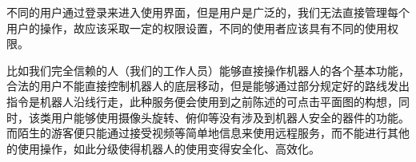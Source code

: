 


不同的用户通过登录来进入使用界面，但是用户是广泛的，我们无法直接管理每个用户的操作，故应该采取一定的权限设置，不同的使用者应该具有不同的使用权限。

比如我们完全信赖的人（我们的工作人员）能够直接操作机器人的各个基本功能，合法的用户不能直接控制机器人的底层移动，但是能够通过部分规定好的路线发出指令是机器人沿线行走，此种服务便会使用到之前陈述的可点击平面图的构想，同时，该类用户能够使用摄像头旋转、俯仰等没有涉及到机器人安全的器件的功能。而陌生的游客便只能通过接受视频等简单地信息来使用远程服务，而不能进行其他的使用操作，如此分级使得机器人的使用变得安全化、高效化。
